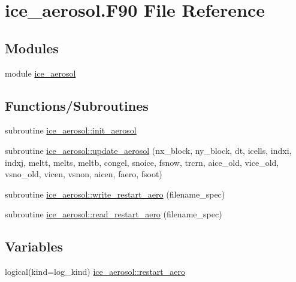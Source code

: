 \hypertarget{ice__aerosol_8F90}{
\section{ice\_\-aerosol.F90 File Reference}
\label{ice__aerosol_8F90}
}
\subsection*{Modules}
\begin{DoxyCompactItemize}
\item 
module \hyperlink{namespaceice__aerosol}{ice\_\-aerosol}
\end{DoxyCompactItemize}
\subsection*{Functions/Subroutines}
\begin{DoxyCompactItemize}
\item 
subroutine \hyperlink{namespaceice__aerosol_aa513eb52e19fad1dae05441487607b63}{ice\_\-aerosol::init\_\-aerosol}
\item 
subroutine \hyperlink{namespaceice__aerosol_a11451c6ed657ce27ffdd01d6c3db0ed4}{ice\_\-aerosol::update\_\-aerosol} (nx\_\-block, ny\_\-block, dt, icells, indxi, indxj, meltt, melts, meltb, congel, snoice, fsnow, trcrn, aice\_\-old, vice\_\-old, vsno\_\-old, vicen, vsnon, aicen, faero, fsoot)
\item 
subroutine \hyperlink{namespaceice__aerosol_a1e014a016b35aba5d5f31a829ffa909f}{ice\_\-aerosol::write\_\-restart\_\-aero} (filename\_\-spec)
\item 
subroutine \hyperlink{namespaceice__aerosol_a423573cf8f7630b777b38860c81adfb0}{ice\_\-aerosol::read\_\-restart\_\-aero} (filename\_\-spec)
\end{DoxyCompactItemize}
\subsection*{Variables}
\begin{DoxyCompactItemize}
\item 
logical(kind=log\_\-kind) \hyperlink{namespaceice__aerosol_a3ceb80d852249f318373d31d28ce9007}{ice\_\-aerosol::restart\_\-aero}
\end{DoxyCompactItemize}
